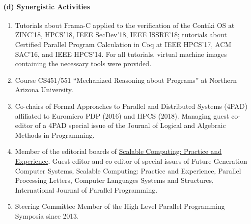 \documentclass[11pt]{article}
\begin{document}


\paragraph{(d) Synergistic Activities}


\begin{enumerate}
\item Tutorials about Frama-C applied to the verification of the
  Contiki OS at ZINC'18, HPCS'18, IEEE SecDev'18, IEEE ISSRE'18;
  tutorials about Certified Parallel Program Calculation in Coq at
  IEEE HPCS'17, ACM SAC'16, and IEEE HPCS'14. For all tutorials,
  virtual machine images containing the necessary tools were provided.
\item Course CS451/551 ``Mechanized Reasoning about Programs'' at
  Northern Arizona University.
\item Co-chairs of Formal Approaches to Parallel and Distributed
  Systems (4PAD) affiliated to Euromicro PDP (2016) and HPCS (2018).
  Managing guest co-editor of a 4PAD special issue of the Journal of
  Logical and Algebraic Methods in Programming.
\item Member of the editorial boards of
  \href{http://www.scpe.org}{Scalable Computing: Practice and
    Experience}. Guest editor and co-editor of special issues of
  Future Generation Computer Systems, Scalable Computing: Practice and
  Experience, Parallel Processing Letters, Computer Languages Systems
  and Structures, International Journal of Parallel Programming.
\item Steering Committee Member of the High Level Parallel Programming
  Symposia since 2013.
\end{enumerate}



%
%
\end{document}
